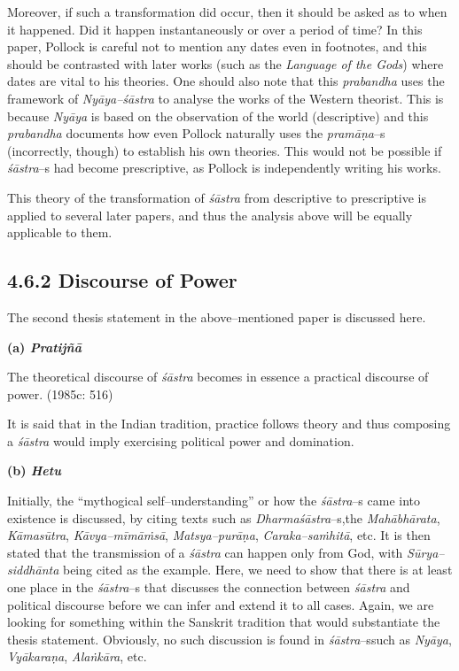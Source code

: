 Moreover, if such a transformation did occur, then it should be asked as to when it happened. Did it happen instantaneously or over a period of time? In this paper, Pollock is careful not to mention any dates even in footnotes, and this should be contrasted with later works (such as the \textit{Language of the Gods}) where dates are vital to his theories. One should also note that this \textit{prabandha} uses the framework of \textit{Nyāya–śāstra }to analyse the works of the Western theorist. This is because \textit{Nyāya }is based on the observation of the world (descriptive) and this \textit{prabandha} documents how even Pollock naturally uses the \textit{pramāṇa}–s (incorrectly, though) to establish his own theories. This would not be possible if \textit{śāstra}–s had become prescriptive, as Pollock is independently writing his works.

This theory of the transformation of \textit{śāstra }from descriptive to prescriptive is applied to several later papers, and thus the analysis above will be equally applicable to them.

\vspace{-.3cm}

\subsection*{4.6.2 Discourse of Power}

The second thesis statement in the above–mentioned paper is discussed here.

\textbf{(a) \textit{Pratijñā }}

\begin{myquote}
The theoretical discourse of \textit{śāstra} becomes in essence a practical discourse of power. (1985c: 516)
\end{myquote}

It is said that in the Indian tradition, practice follows theory and thus composing a\textit{ śāstra }would imply exercising political power and domination.

\textbf{(b) \textit{Hetu}}

Initially, the “mythogical self–understanding” or how the \textit{śāstra}–s came into existence is discussed, by citing texts such as \textit{Dharmaśāstra}–s,\break the \textit{Mahābhārata}, \textit{Kāmasūtra}, \textit{Kāvya–mīmāṁsā}, \textit{Matsya–purāṇa}, \textit{Caraka–saṁhitā}, etc. It is then stated that the transmission of a \textit{śāstra }can happen only from God, with \textit{Sūrya–siddhānta} being cited as the example. Here, we need to show that there is at least one place in the\textit{ śāstra}–s that discusses the connection between \textit{śāstra} and political discourse before we can infer and extend it to all cases. Again, we are looking for something within the Sanskrit tradition that would substantiate the thesis statement. Obviously, no such discussion is found in \textit{śāstra}–s\break such as \textit{Nyāya}, \textit{Vyākaraṇa}, \textit{Alaṅkāra}, etc.

